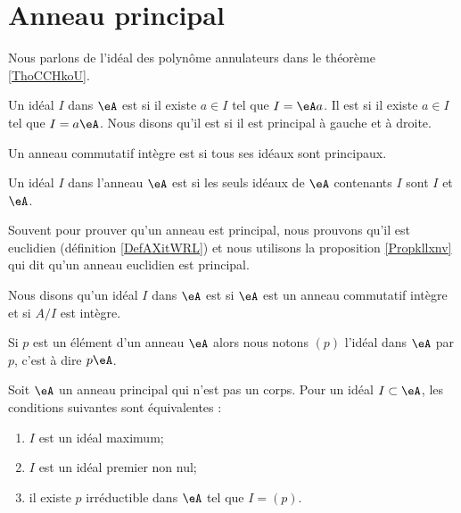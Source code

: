 \section{Anneau principal}

Nous parlons de l'idéal des polynôme annulateurs dans le théorème \ref{ThoCCHkoU}.

\begin{definition}      \label{DefIdPrinpuMrbOq}
    Un idéal \( I\) dans \(\eA\) est  si il existe \( a\in I\) tel que \( I=\eA a\). Il est  si il existe \( a\in I\) tel que \( I=a\eA\). Nous disons qu'il est  si il est principal à gauche et à droite.

    Un anneau commutatif intègre est  si tous ses idéaux sont principaux.
\end{definition}

Un idéal \( I\) dans l'anneau \( \eA\) est  si les seuls idéaux de \( \eA\) contenants \( I\) sont \( I\) et \( \eA\).

Souvent pour prouver qu'un anneau est principal, nous prouvons qu'il est euclidien (définition \ref{DefAXitWRL}) et nous utilisons la proposition \ref{Propkllxnv} qui dit qu'un anneau euclidien est principal.


\begin{definition}
    Nous disons qu'un idéal \( I\) dans \( \eA\) est  si \( \eA\) est un anneau commutatif intègre et si \( A/I\) est intègre.
\end{definition}

\begin{definition}  \label{DefSKTooOTauAR}
    Si \( p\) est un élément d'un anneau \( \eA\) alors nous notons \( (p)\) l'idéal dans \( \eA\)  par \( p\), c'est à dire \( p\eA\).
\end{definition}

\begin{proposition} \label{PropomqcGe}
    Soit \( \eA\) un anneau principal qui n'est pas un corps. Pour un idéal \( I\subset \eA\), les conditions suivantes sont équivalentes :
    \begin{enumerate}
        \item
            \( I\) est un idéal maximum;
        \item
            \( I\) est un idéal premier non nul;
        \item
            il existe \( p\) irréductible dans \( \eA\) tel que \( I=(p)\).
    \end{enumerate}
\end{proposition}

